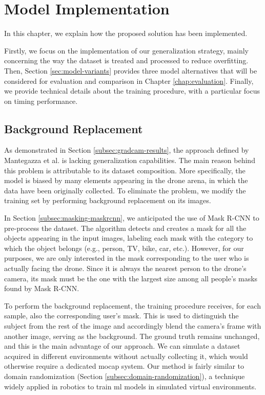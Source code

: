 \chapter{Model Implementation}
\label{chap:implementation}

In this chapter, we explain how the proposed solution has been implemented.

Firstly, we focus on the implementation of our generalization strategy, mainly concerning the way the dataset is treated and processed to reduce overfitting. Then, Section \ref{sec:model-variants} provides three model alternatives that will be considered for evaluation and comparison in Chapter \ref{chap:evaluation}. Finally, we provide technical details about the training procedure, with a particular focus on timing performance. 




\section{Background Replacement}
\label{sec:implementation-bgreplace}

As demonstrated in Section \ref{subsec:gradcam-results}, the approach defined by Mantegazza et al. \cite{mantegazza2019visionbased} is lacking generalization capabilities. The main reason behind this problem is attributable to its dataset composition. More specifically, the model is biased by many elements appearing in the drone arena, in which the data have been originally collected. To eliminate the problem, we modify the training set by performing background replacement on its images.

In Section \ref{subsec:masking-maskrcnn}, we anticipated the use of Mask R-CNN to pre-process the dataset. The algorithm detects and creates a mask for all the objects appearing in the input images, labeling each mask with the category to which the object belongs (e.g., person, TV, bike, car, etc.). However, for our purposes, we are only interested in the mask corresponding to the user who is actually facing the drone. Since it is always the nearest person to the drone's camera, its mask must be the one with the largest size among all people's masks found by Mask R-CNN.

\medskip

To perform the background replacement, the training procedure receives, for each sample, also the corresponding user's mask. This is used to distinguish the subject from the rest of the image and accordingly blend the camera's frame with another image, serving as the background. The ground truth remains unchanged, and this is the main advantage of our approach. We can simulate a dataset acquired in different environments without actually collecting it, which would otherwise require a dedicated \gls{mocap} system. Our method is fairly similar to domain randomization (Section \ref{subsec:domain-randomization}), a technique widely applied in robotics to train \gls{ml} models in simulated virtual environments.

